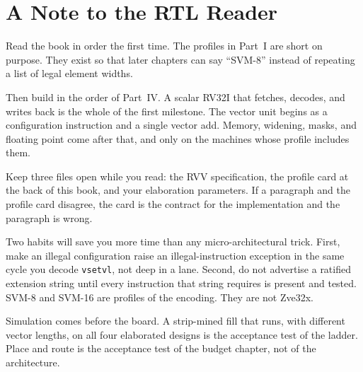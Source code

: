 \chapter{A Note to the RTL Reader}

Read the book in order the first time. The profiles in Part~I are short on purpose. They exist so that later chapters can say ``SVM-8'' instead of repeating a list of legal element widths.

Then build in the order of Part~IV. A scalar RV32I that fetches, decodes, and writes back is the whole of the first milestone. The vector unit begins as a configuration instruction and a single vector add. Memory, widening, masks, and floating point come after that, and only on the machines whose profile includes them.

Keep three files open while you read: the RVV specification, the profile card at the back of this book, and your elaboration parameters. If a paragraph and the profile card disagree, the card is the contract for the implementation and the paragraph is wrong.

Two habits will save you more time than any micro-architectural trick. First, make an illegal configuration raise an illegal-instruction exception in the same cycle you decode \texttt{vsetvl}, not deep in a lane. Second, do not advertise a ratified extension string until every instruction that string requires is present and tested. SVM-8 and SVM-16 are profiles of the encoding. They are not Zve32x.

Simulation comes before the board. A strip-mined fill that runs, with different vector lengths, on all four elaborated designs is the acceptance test of the ladder. Place and route is the acceptance test of the budget chapter, not of the architecture.
